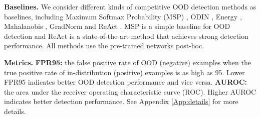 \documentclass{article}
\begin{document}
\textbf{Baselines.} We consider different kinds of competitive OOD detection methods as baselines, including Maximum Softmax Probability (MSP) \cite{hendrycks17baseline}, ODIN \cite{ODIN}, Energy \cite{liu2020energy}, Mahalanobis \cite{Mahalanobis}, GradNorm \cite{huang2021importance} and ReAct \cite{sun2021react}. MSP is a simple baseline for OOD detection and ReAct is a state-of-the-art method that achieves strong detection performance. All methods use the pre-trained networks post-hoc.

\textbf{Metrics.} \textbf{FPR95:} the false positive rate of OOD (negative) examples when the true positive rate of in-distribution (positive) examples is as high as 95. Lower FPR95 indicates better OOD detection performance and {vice versa}. \textbf{AUROC:} the area under the receiver operating characteristic curve (ROC). Higher AUROC indicates better detection performance.
See Appendix \ref{App:details} for more details.
\end{document}
